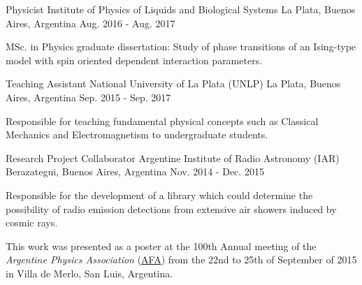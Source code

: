 \begin{cventries}
  \cventry
    {Physicist} %
    {Institute of Physics of Liquids and Biological Systems \href{https://mattborghi.github.io/projects/MSc\%20Thesis/}{\faGithub}} %
    {La Plata, Buenos Aires, Argentina} %
    {Aug. 2016 - Aug. 2017} %
    {
      \begin{cvitems} %
        \item {MSc. in Physics graduate dissertation: Study of phase transitions of an Ising-type model with spin oriented dependent interaction parameters.}
      \end{cvitems}
    }

  \cventry
    {Teaching Assistant} %
    {National University of La Plata (UNLP)} %
    {La Plata, Buenos Aires, Argentina} %
    {Sep. 2015 - Sep. 2017} %
    {
      \begin{cvitems} %
        \item {Responsible for teaching fundamental physical concepts such as Classical Mechanics and Electromagnetism to undergraduate students.}
      \end{cvitems}
    }

  \cventry
    {Research Project Collaborator} %
    {Argentine Institute of Radio Astronomy (IAR) \href{https://mattborghi.github.io/projects/ALAMBRE/}{\faGithub}} %
    {Berazategui, Buenos Aires, Argentina} %
    {Nov. 2014 - Dec. 2015} %
    {
      \begin{cvitems} %
           \item {Responsible for the development of a library which could determine the possibility of radio emission detections from extensive air showers induced by cosmic rays.}
          \item {This work was presented as a poster at the 100th Annual meeting of the \emph{Argentine Physics Association} (\href{https://www.fisica.org.ar/}{AFA}) from the 22nd to 25th of September of 2015 in Villa de Merlo, San Luis, Argentina.}
      \end{cvitems}
    }
 
\end{cventries}
